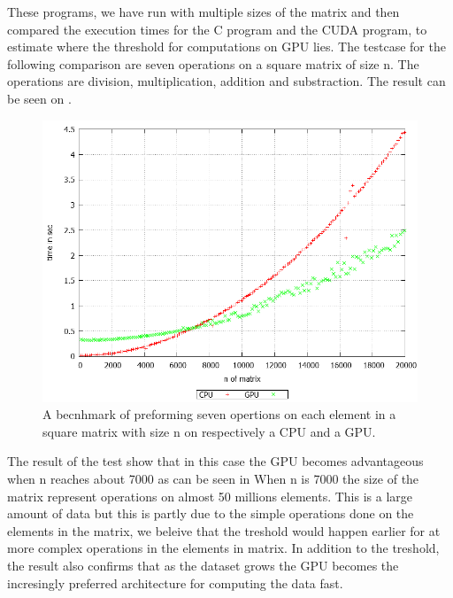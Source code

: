 These programs, we have run with multiple sizes of the matrix and then compared the execution times for the C program and the CUDA program, to estimate where the threshold for computations on GPU lies.
The testcase for the following comparison are seven operations on a square matrix of size n.
The operations are division, multiplication, addition and substraction.
The result can be seen on .
\begin{figure}[h!]
\centering
 \includegraphics[width=1\textwidth]{figures/benchmark.png} %
\caption{A becnhmark of preforming seven opertions on each element in a square matrix with size n on respectively a CPU and a GPU.}\label{image:benchmark}
\vspace{-15pt}
\end{figure}

The result of the test show that in this case the GPU becomes advantageous when n reaches about 7000 as can be seen in 
When n is 7000 the size of the matrix represent operations on almost 50 millions elements.
This is a large amount of data but this is partly due to the simple operations done on the elements in the matrix, we beleive that the treshold would happen earlier for at more complex operations in the elements in matrix.
In addition to the treshold, the result also confirms that as the dataset grows the GPU becomes the incresingly preferred architecture for computing the data fast.
